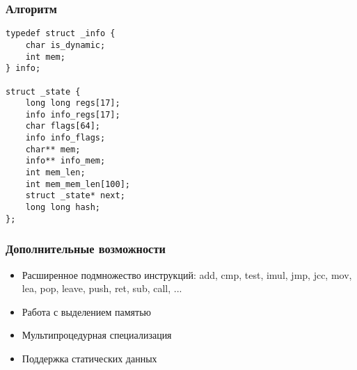 \documentclass[demo]{beamer}
\begin{document}
\lstset{language=C}
\begin{frame}[fragile]\frametitle{Алгоритм}
\begin{lstlisting}
typedef struct _info {
    char is_dynamic;
    int mem;
} info;

struct _state {
    long long regs[17];
    info info_regs[17];
    char flags[64];
    info info_flags;
    char** mem;
    info** info_mem;
    int mem_len;
    int mem_mem_len[100];
    struct _state* next;
    long long hash;
};
\end{lstlisting}
\end{frame}

\lstset{language=C}
\begin{frame}[fragile]\frametitle{Дополнительные возможности}
\begin{itemize}
    \item {Расширенное подмножество инструкций: add, cmp, test, imul, jmp, jcc, mov, lea, pop, leave, push, ret, sub, call, ...}
    \vfill
    \item {Работа с выделением памятью}
    \vfill
    \item {Мультипроцедурная специализация}
    \vfill
    \item {Поддержка статических данных}
\end{itemize}
\end{frame}
\end{document}
